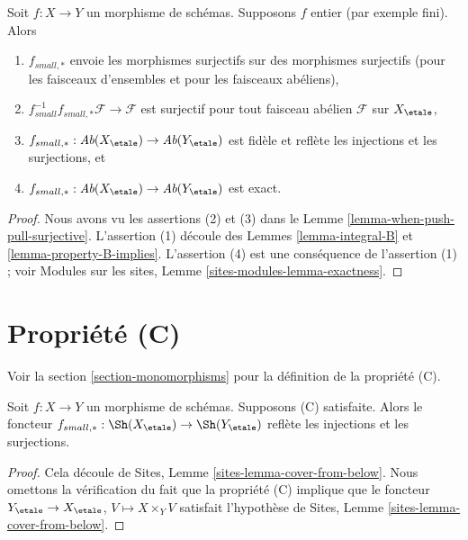 \begin{lemma}
\label{lemma-what-integral}
Soit $f : X \to Y$ un morphisme de sch\'emas.
Supposons $f$ entier (par exemple fini).
Alors
\begin{enumerate}
\item $f_{small, *}$ envoie les morphismes surjectifs sur des morphismes surjectifs (pour les faisceaux
d'ensembles et pour les faisceaux ab\'eliens),
\item $f_{small}^{-1}f_{small, *}\mathcal{F} \to \mathcal{F}$
est surjectif pour tout faisceau ab\'elien $\mathcal{F}$ sur $X_\etale$,
\item
$f_{small, *} :
\textit{Ab}(X_\etale)
\to
\textit{Ab}(Y_\etale)$
est fid\`ele et refl\`ete les injections et les surjections, et
\item
$f_{small, *} :
\textit{Ab}(X_\etale)
\to
\textit{Ab}(Y_\etale)$
est exact.
\end{enumerate}
\end{lemma}

\begin{proof}
Nous avons vu les assertions (2) et (3) dans le
Lemme \ref{lemma-when-push-pull-surjective}.
L'assertion (1) d\'ecoule des
Lemmes \ref{lemma-integral-B} et \ref{lemma-property-B-implies}.
L'assertion (4) est une cons\'equence de l'assertion (1) ; voir
Modules sur les sites, Lemme \ref{sites-modules-lemma-exactness}.
\end{proof}








\section{Propri\'et\'e (C)}
\label{section-C}

\noindent
Voir la section \ref{section-monomorphisms} pour la d\'efinition de la propri\'et\'e
(C).

\begin{lemma}
\label{lemma-property-C-implies}
Soit $f : X \to Y$ un morphisme de sch\'emas. Supposons (C) satisfaite. Alors le foncteur
$f_{small, *} :
\Sh(X_\etale)
\to
\Sh(Y_\etale)$
refl\`ete les injections et les surjections.
\end{lemma}

\begin{proof}
Cela d\'ecoule de
Sites, Lemme \ref{sites-lemma-cover-from-below}.
Nous omettons la v\'erification du fait que la propri\'et\'e (C) implique que le foncteur
$Y_\etale \to X_\etale$, $V \mapsto X \times_Y V$
satisfait l'hypoth\`ese de
Sites, Lemme \ref{sites-lemma-cover-from-below}.
\end{proof}

